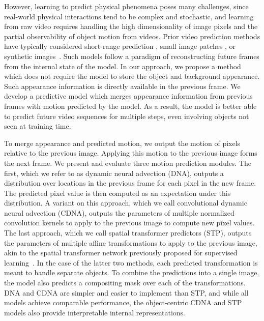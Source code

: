 \documentclass{article}
\newcommand{\atari}{acvpa-oglls-15}
\newcommand{\nyu}{vpbmse-mcl-16}
\begin{document}
However, learning to predict physical phenomena poses many challenges, since real-world physical interactions tend to be complex and stochastic,
and learning from raw video requires handling the high dimensionality of image pixels and the partial observability of object motion from videos.
Prior video prediction methods have typically considered short-range prediction \cite{\nyu}, small image patches \cite{ulvr-sms-15},
or synthetic images~\cite{\atari}.
Such models follow a paradigm of reconstructing future frames from the internal state of the model. In our approach, we propose a method which does not require the model
to store the object and background appearance. Such appearance information is directly available in the previous frame. We develop a predictive model which merges
appearance information from previous frames with motion predicted by the model. As a result, the model is better able to predict future video sequences for multiple steps,
even involving objects not seen at training time.

To merge appearance and predicted motion, we output the motion of pixels relative to the previous image. Applying this motion to the previous image forms the next frame.
We present and evaluate three motion prediction modules. The first, which we refer to as dynamic neural advection (DNA), outputs a distribution over locations in the previous frame for each pixel in the new frame.
The predicted pixel value is then computed as an expectation under this distribution.
A variant on this approach, which we call convolutional dynamic neural advection (CDNA), outputs the parameters of multiple
normalized convolution kernels to apply to the previous image to compute new pixel values.
The last approach, which we call spatial transformer predictors (STP),
outputs the parameters of multiple
affine transformations to apply to the previous image, akin to the spatial transformer network
previously proposed for supervised learning~\cite{jsz-stn-15}.
In the case of the latter two methods, each predicted transformation is meant to handle separate objects. To combine the predictions into a single image, the model also predicts a compositing mask over each of the
transformations. DNA and CDNA are simpler and easier to implement than STP, and while all models achieve comparable performance,
the object-centric CDNA and STP models also provide interpretable internal representations.
\end{document}
